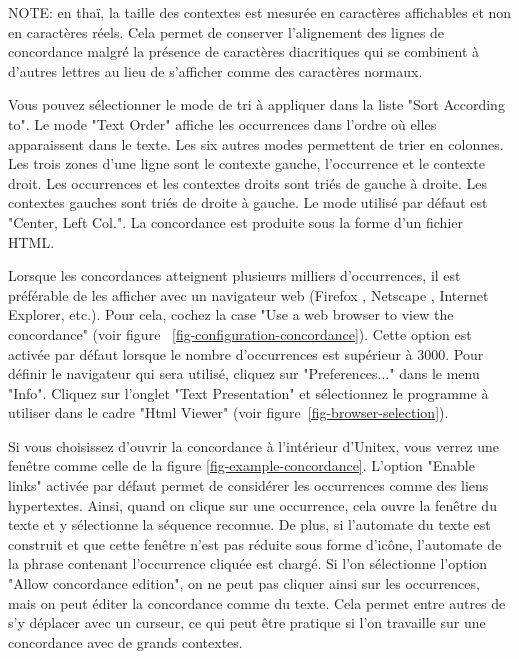 \bigskip
\noindent NOTE: en thaï, la taille des contextes est mesurée en caractères affichables et non en
caractères réels. Cela permet de conserver l’alignement des lignes de concordance malgré la
présence de caractères diacritiques qui se combinent à d’autres lettres au lieu de s’afficher
comme des caractères normaux.


\bigskip
\noindent Vous pouvez sélectionner le mode de tri à appliquer dans la liste "Sort According to". Le
mode "Text Order" affiche les occurrences dans l’ordre où elles apparaissent dans le texte.
Les six autres modes permettent de trier en colonnes. Les trois zones d’une ligne sont le
contexte gauche, l’occurrence et le contexte droit. Les occurrences et les contextes droits
sont triés de gauche à droite. Les contextes gauches sont triés de droite à gauche. Le mode
utilisé par défaut est "Center, Left Col.". La concordance est produite sous la forme d’un
fichier HTML.

\bigskip
\noindent Lorsque les concordances atteignent plusieurs milliers d’occurrences, il est préférable
de les afficher avec un navigateur web (Firefox \cite{Firefox}, Netscape \cite{Netscape}, 
Internet Explorer, etc.).
\newline
Pour cela, cochez la case "Use a web browser to view the concordance" (voir figure
	~\ref{fig-configuration-concordance}). 
Cette option est activée par défaut lorsque le nombre d’occurrences est supérieur à 3000.
Pour définir le navigateur qui sera utilisé, cliquez sur "Preferences..." dans le menu "Info".
Cliquez sur l’onglet "Text Presentation" et sélectionnez le programme à utiliser dans le cadre
"Html Viewer" (voir figure~\ref{fig-browser-selection}).

\bigskip
\noindent {} Si vous choisissez d’ouvrir la concordance à l’intérieur
d’Unitex, vous verrez une fenêtre
comme celle de la figure \ref{fig-example-concordance}. 
L’option "Enable links" activée par défaut permet de considérer les occurrences comme des liens
hypertextes.
Ainsi, quand on clique sur une occurrence,
cela ouvre la fenêtre du texte et y sélectionne la séquence reconnue. De plus, si l’automate
du texte est construit et que cette fenêtre n’est pas réduite sous forme d’icône, l’automate
de la phrase contenant l’occurrence cliquée est chargé. Si l’on sélectionne l’option "Allow
concordance edition", on ne peut pas cliquer ainsi sur les occurrences, mais on peut éditer
la concordance comme du texte. Cela permet entre autres de s’y déplacer avec un curseur,
ce qui peut être pratique si l’on travaille sur une concordance avec de grands contextes.


